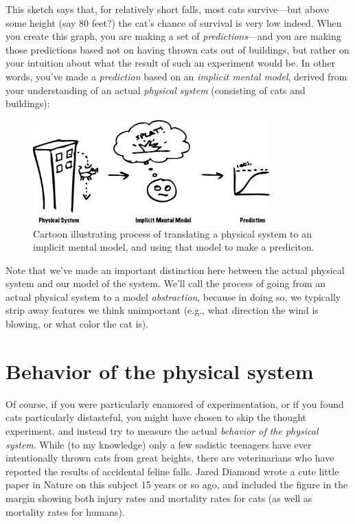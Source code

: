 This sketch says that, for relatively short falls, most cats
survive---but above some height (say 80 feet?) the cat's chance of
survival is very low indeed.  When you create this graph, you are
making a set of {\it predictions}---and you are making those
predictions based not on having thrown cats out of buildings, but
rather on your intuition about what the result of such an experiment
would be.  In other words, you've made a {\it prediction} based on an
{\it implicit mental model}, derived from your understanding of an
actual {\it physical system} (consisting of cats and buildings):

\begin{figure}[h!]
\centerline{\includegraphics[height=4cm]{figs/SystemImplicitModelPrediction}}
\caption{Cartoon illustrating process of translating a physical system to an implicit mental model, and using that model to make a prediciton.}
\end{figure}


Note that we've made an important distinction here between the actual
physical system and our model of the system.  We'll call the process
of going from an actual physical system to a model {\it abstraction},
because in doing so, we typically strip away features we think
unimportant (e.g., what direction the wind is blowing, or what color
the cat is).

\section{Behavior of the physical system}

Of course, if you were particularly enamored of experimentation, or if
you found cats particularly distasteful, you might have chosen to skip
the thought experiment, and instead try to measure the actual {\it
  behavior of the physical system}.  While (to my knowledge) only a
few sadistic teenagers have ever intentionally thrown cats from great
heights, there are veterinarians who have reported the results of
accidental feline falls.  Jared Diamond wrote a cute little paper in
Nature on this subject 15 years or so ago, and included the figure in
the margin showing both injury rates and mortality rates for cats (as
well as mortality rates for humans).

